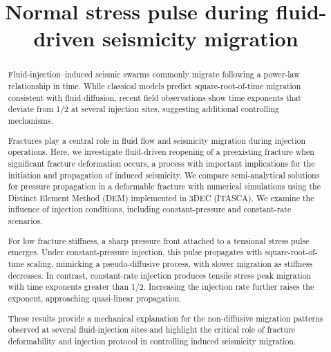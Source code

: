 \documentclass[draft]{agujournal2019}
\begin{document}
\title{Normal stress pulse during fluid-driven seismicity migration}

\correspondingauthor{}{}

\begin{keypoints}
	\item
	\item
	\item
\end{keypoints}

\begin{abstract}

	Fluid-injection–induced seismic swarms commonly migrate following a power-law relationship in time. While classical models predict square-root-of-time migration consistent with fluid diffusion, recent field observations show time exponents that deviate from 1/2 at several injection sites, suggesting additional controlling mechanisms.

	Fractures play a central role in fluid flow and seismicity migration during injection operations. Here, we investigate fluid-driven reopening of a preexisting fracture when significant fracture deformation occurs, a process with important implications for the initiation and propagation of induced seismicity. We compare semi-analytical solutions for pressure propagation in a deformable fracture with numerical simulations using the Distinct Element Method (DEM) implemented in 3DEC (ITASCA). We examine the influence of injection conditions, including constant-pressure and constant-rate scenarios.

	For low fracture stiffness, a sharp pressure front attached to a tensional stress pulse emerges. Under constant-pressure injection, this pulse propagates with square-root-of-time scaling, mimicking a pseudo-diffusive process, with slower migration as stiffness decreases. In contrast, constant-rate injection produces tensile stress peak migration with time exponents greater than 1/2. Increasing the injection rate further raises the exponent, approaching quasi-linear propagation.

	These results provide a mechanical explanation for the non-diffusive migration patterns observed at several fluid-injection sites and highlight the critical role of fracture deformability and injection protocol in controlling induced seismicity migration.


\end{abstract}
\end{document}
